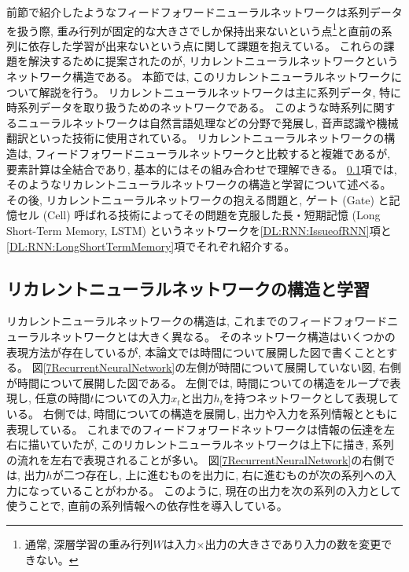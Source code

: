 前節で紹介したようなフィードフォワードニューラルネットワークは系列データを扱う際, 重み行列が固定的な大きさでしか保持出来ないという点\footnote{通常, 深層学習の重み行列$W$は入力$\times$出力の大きさであり入力の数を変更できない。}と直前の系列に依存した学習が出来ないという点に関して課題を抱えている。
これらの課題を解決するために提案されたのが, リカレントニューラルネットワークというネットワーク構造である。
本節では, このリカレントニューラルネットワークについて解説を行う。
リカレントニューラルネットワークは主に系列データ, 特に時系列データを取り扱うためのネットワークである。
このような時系列に関するニューラルネットワークは自然言語処理などの分野で発展し, 音声認識や機械翻訳といった技術に使用されている。
リカレントニューラルネットワークの構造は, フィードフォワードニューラルネットワークと比較すると複雑であるが, 要素計算は全結合であり, 基本的にはその組み合わせで理解できる。
\ref{DL:RNN:ReccurentNeuralNetwork}項では, そのようなリカレントニューラルネットワークの構造と学習について述べる。
その後, リカレントニューラルネットワークの抱える問題と, ゲート (Gate) と記憶セル (Cell) 呼ばれる技術によってその問題を克服した長・短期記憶 (Long Short-Term Memory, LSTM\cite{LSTMpaper}) というネットワークを\ref{DL:RNN:IssueofRNN}項と\ref{DL:RNN:LongShortTermMemory}項でそれぞれ紹介する。


\subsection{リカレントニューラルネットワークの構造と学習} \label{DL:RNN:ReccurentNeuralNetwork}

リカレントニューラルネットワークの構造は, これまでのフィードフォワードニューラルネットワークとは大きく異なる。
そのネットワーク構造はいくつかの表現方法が存在しているが, 本論文では時間について展開した図で書くこととする。
図\ref{7RecurrentNeuralNetwork}の左側が時間について展開していない図, 右側が時間について展開した図である。
左側では, 時間についての構造をループで表現し, 任意の時間$t$についての入力$x_t$と出力$h_t$を持つネットワークとして表現している。
右側では, 時間についての構造を展開し, 出力や入力を系列情報とともに表現している。
これまでのフィードフォワードネットワークは情報の伝達を左右に描いていたが, このリカレントニューラルネットワークは上下に描き, 系列の流れを左右で表現されることが多い。
図\ref{7RecurrentNeuralNetwork}の右側では, 出力$h$が二つ存在し, 上に進むものを出力に, 右に進むものが次の系列への入力になっていることがわかる。
このように, 現在の出力を次の系列の入力として使うことで, 直前の系列情報への依存性を導入している。

